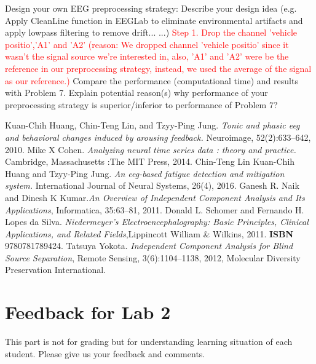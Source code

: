 \documentclass[a4 paper]{article}
\begin{document}
\begin{tcolorbox}[colback=RubineRed!5!white,colframe=RubineRed!75!black]
Design your own EEG preprocessing strategy:
 Describe your design idea (e.g. Apply CleanLine function in EEGLab to eliminate environmental artifacts and apply lowpass filtering to remove drift... ...)
\textcolor{red}{\newline Step 1. Drop the channel 'vehicle positio','A1' and 'A2' (reason: We dropped channel 'vehicle positio' since it wasn’t the signal source we're interested in, also, 'A1' and 'A2' were be the reference in our preprocessing strategy, instead, we used the average of the signal as our reference.)
}
 Compare the performance (computational time) and results with Problem 7.
 Explain potential reason(s) why performance of your preprocessing strategy is superior/inferior to performance of Problem 7? 
\end{tcolorbox}
\begin{thebibliography}{6}
Kuan-Chih Huang, Chin-Teng Lin, and Tzyy-Ping Jung. \textit{Tonic and phasic eeg and behavioral changes induced by arousing feedback.} Neuroimage, 52(2):633–642, 2010.
Mike X Cohen. \textit{Analyzing neural time series data : theory and practice.} Cambridge, Massachusetts :The MIT Press, 2014.
\bibitem{}
Chin-Teng Lin Kuan-Chih Huang and Tzyy-Ping Jung. \textit{An eeg-based fatigue detection and mitigation system.} International Journal of Neural Systems, 26(4), 2016.
Ganesh R. Naik and Dinesh K Kumar.\textit{An Overview of Independent Component Analysis and Its Applications}, Informatica, 35:63--81, 2011.
Donald L. Schomer and Fernando H. Lopes da Silva.
\textit{Niedermeyer's Electroencephalography: Basic Principles, Clinical Applications, and Related Fields},Lippincott William \& Wilkins, 2011. \textbf{ISBN} 9780781789424.
Tatsuya Yokota. \textit{Independent Component Analysis for Blind Source Separation}, Remote Sensing, 3(6):1104--1138, 2012, Molecular Diversity Preservation International.
\end{thebibliography}
\newpage
\section{Feedback for Lab 2}
This part is not for grading but for understanding learning situation of each student. Please give us your feedback and comments.
\end{document}

